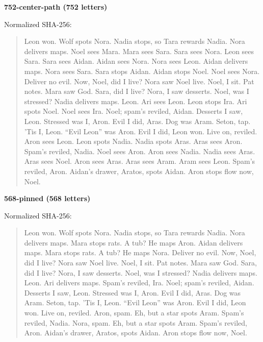 \par\medskip
{}
\noindent\textbf{752-center-path (752 letters)}\par
\noindent Normalized SHA-256: \par
\begin{quote}\small\raggedright
Leon won. Wolf spots Nora. Nadia stops, so Tara rewards Nadia. Nora delivers maps. Noel sees Mara. Mara sees Sara. Sara sees Nora. Leon sees Sara. Sara sees Aidan. Aidan sees Nora. Nora sees Leon. Aidan delivers maps. Nora sees Sara. Sara stops Aidan. Aidan stops Noel. Noel sees Nora. Deliver no evil. Now, Noel, did I live? Nora saw Noel live. Noel, I sit. Pat notes. Mara saw God. Sara, did I live? Nora, I saw desserts. Noel, was I stressed? Nadia delivers maps. Leon. Ari sees Leon. Leon stops Ira. Ari spots Noel. Noel sees Ira. Noel; spam's reviled, Aidan. Desserts I saw, Leon. Stressed was I, Aron. Evil I did, Aras. Dog was Aram. Seton, tap. 'Tis I, Leon. ``Evil Leon'' was Aron. Evil I did, Leon won. Live on, reviled. Aron sees Leon. Leon spots Nadia. Nadia spots Aras. Aras sees Aron. Spam's reviled, Nadia. Noel sees Aron. Aron sees Nadia. Nadia sees Aras. Aras sees Noel. Aron sees Aras. Aras sees Aram. Aram sees Leon. Spam's reviled, Aron. Aidan's drawer, Aratos, spots Aidan. Aron stops flow now, Noel.
\end{quote}
\par\medskip
{}
\noindent\textbf{568-pinned (568 letters)}\par
\noindent Normalized SHA-256: \par
\begin{quote}\small\raggedright
Leon won. Wolf spots Nora. Nadia stops, so Tara rewards Nadia. Nora delivers maps. Mara stops rats. A tub? He maps Aron. Aidan delivers maps. Mara stops rats. A tub? He maps Nora. Deliver no evil. Now, Noel, did I live? Nora saw Noel live. Noel, I sit. Pat notes. Mara saw God. Sara, did I live? Nora, I saw desserts. Noel, was I stressed? Nadia delivers maps. Leon. Ari delivers maps. Spam's reviled, Ira. Noel; spam's reviled, Aidan. Desserts I saw, Leon. Stressed was I, Aron. Evil I did, Aras. Dog was Aram. Seton, tap. 'Tis I, Leon. ``Evil Leon'' was Aron. Evil I did, Leon won. Live on, reviled. Aron, spam. Eh, but a star spots Aram. Spam's reviled, Nadia. Nora, spam. Eh, but a star spots Aram. Spam's reviled, Aron. Aidan's drawer, Aratos, spots Aidan. Aron stops flow now, Noel.
\end{quote}
